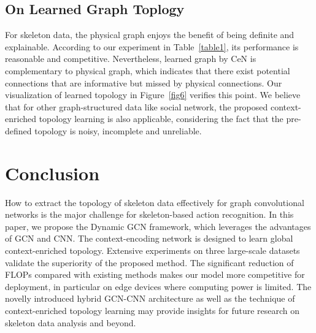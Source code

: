\documentclass[sigconf]{acmart}
\begin{document}
\subsection{On Learned Graph Toplogy}



For skeleton data, the physical graph enjoys the benefit of being definite and explainable. According to our experiment in Table~\ref{table1}, its performance is reasonable and competitive. Nevertheless, learned graph by CeN is complementary to physical graph, which indicates that there exist potential connections that are informative but missed by physical connections. Our visualization of learned topology in Figure~\ref{fig6} verifies this point. We believe that for other graph-structured data like social network, the proposed context-enriched topology learning is also applicable, considering the fact that the pre-defined topology is noisy, incomplete and unreliable.



\section{Conclusion}
How to extract the topology of skeleton data effectively for graph convolutional networks is the major challenge for skeleton-based action recognition. In this paper, we propose the Dynamic GCN framework, which leverages the advantages of GCN and CNN. The context-encoding network is designed to learn global context-enriched topology. Extensive experiments on three large-scale datasets validate the superiority of the proposed method. The significant reduction of FLOPs compared with existing methods makes our model more competitive for deployment, in particular on edge devices where computing power is limited. The novelly introduced hybrid GCN-CNN architecture as well as the technique of context-enriched topology learning may provide insights for future research on skeleton data analysis and beyond.





\end{document}
